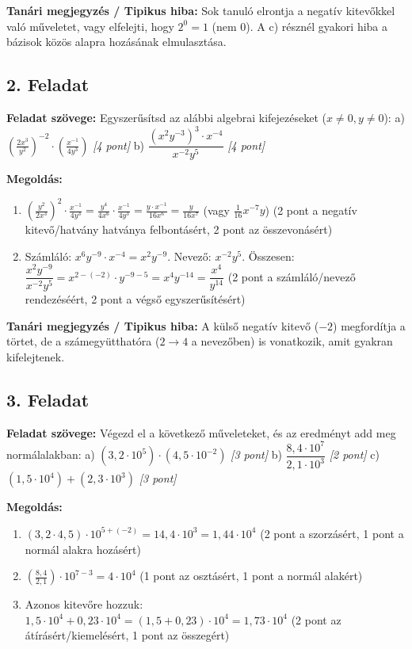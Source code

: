 \documentclass[11pt,a4paper]{article}
\begin{document}
\noindent\textbf{Tanári megjegyzés / Tipikus hiba:} 
Sok tanuló elrontja a negatív kitevőkkel való műveletet, vagy elfelejti, hogy $2^0 = 1$ (nem 0). A c) résznél gyakori hiba a bázisok közös alapra hozásának elmulasztása.

\subsection*{2. Feladat}
\textbf{Feladat szövege:} Egyszerűsítsd az alábbi algebrai kifejezéseket ($x \neq 0, y \neq 0$):
a) $\left(\frac{2x^3}{y^2}\right)^{-2} \cdot \left(\frac{x^{-1}}{4y^3}\right)$ \hfill \textit{[4 pont]}
b) $\dfrac{(x^2 y^{-3})^3 \cdot x^{-4}}{x^{-2} y^5}$ \hfill \textit{[4 pont]}

\textbf{Megoldás:}
\begin{enumerate}
    \item[a)] $\left(\frac{y^2}{2x^3}\right)^2 \cdot \frac{x^{-1}}{4y^3} = \frac{y^4}{4x^6} \cdot \frac{x^{-1}}{4y^3} = \frac{y \cdot x^{-1}}{16 x^6} = \frac{y}{16 x^7}$ (vagy $\frac{1}{16}x^{-7}y$) \hfill (2 pont a negatív kitevő/hatvány hatványa felbontásért, 2 pont az összevonásért)
    \item[b)] Számláló: $x^6 y^{-9} \cdot x^{-4} = x^2 y^{-9}$. Nevező: $x^{-2} y^5$.
    Összesen: $\dfrac{x^2 y^{-9}}{x^{-2} y^5} = x^{2 - (-2)} \cdot y^{-9 - 5} = x^4 y^{-14} = \dfrac{x^4}{y^{14}}$ \hfill (2 pont a számláló/nevező rendezéséért, 2 pont a végső egyszerűsítésért)
\end{enumerate}

\noindent\textbf{Tanári megjegyzés / Tipikus hiba:} 
A külső negatív kitevő ($-2$) megfordítja a törtet, de a számegyütthatóra ($2 \rightarrow 4$ a nevezőben) is vonatkozik, amit gyakran kifelejtenek.

\subsection*{3. Feladat}
\textbf{Feladat szövege:} Végezd el a következő műveleteket, és az eredményt add meg normálalakban:
a) $(3,2 \cdot 10^5) \cdot (4,5 \cdot 10^{-2})$ \hfill \textit{[3 pont]}
b) $\dfrac{8,4 \cdot 10^7}{2,1 \cdot 10^3}$ \hfill \textit{[2 pont]}
c) $(1,5 \cdot 10^4) + (2,3 \cdot 10^3)$ \hfill \textit{[3 pont]}

\textbf{Megoldás:}
\begin{enumerate}
    \item[a)] $(3,2 \cdot 4,5) \cdot 10^{5+(-2)} = 14,4 \cdot 10^3 = 1,44 \cdot 10^4$ \hfill (2 pont a szorzásért, 1 pont a normál alakra hozásért)
    \item[b)] $\left(\frac{8,4}{2,1}\right) \cdot 10^{7-3} = 4 \cdot 10^4$ \hfill (1 pont az osztásért, 1 pont a normál alakért)
    \item[c)] Azonos kitevőre hozzuk: $1,5 \cdot 10^4 + 0,23 \cdot 10^4 = (1,5 + 0,23) \cdot 10^4 = 1,73 \cdot 10^4$ \hfill (2 pont az átírásért/kiemelésért, 1 pont az összegért)
\end{enumerate}
\end{document}
